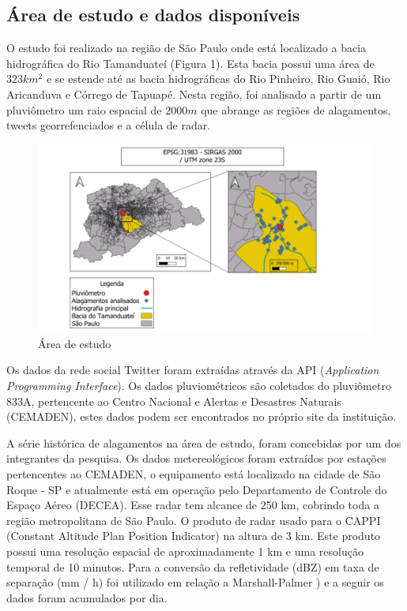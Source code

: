 \subsection{Área de estudo e dados disponíveis}
O estudo foi realizado na região de São Paulo onde está localizado a bacia hidrográfica do Rio Tamanduateí (Figura 1). Esta bacia possui uma área de \(323km^2\) e se estende até as bacia hidrográficas do Rio Pinheiro, Rio Guaió, Rio Aricanduva e Córrego de Tapuapé. Nesta região, foi analisado a partir de um pluviômetro um raio espacial de \(2000m\) que abrange as regiões de alagamentos, tweets georrefenciados e a célula de radar.
\begin{figure}[H]
    \centering
    \includegraphics[scale=0.5]{imagens/ic_att.png}
    \caption{Área de estudo }
    \label{fig:my_label}
\end{figure}

\par Os dados da rede social Twitter foram extraídas através da API (\textit{Application Programming Interface}). Os dados pluviométricos são coletados do pluviômetro 833A, pertencente ao Centro Nacional e Alertas e Desastres Naturais (CEMADEN), estes dados podem ser encontrados no próprio site da instituição.  
\par A série histórica de alagamentos na área de estudo, foram concebidas por um dos integrantes da pesquisa. Os dados metereológicos foram extraídos por estações pertencentes ao CEMADEN, o equipamento está localizado na cidade de São Roque - SP e atualmente está em operação pelo Departamento de Controle do Espaço Aéreo (DECEA). Esse radar tem alcance de 250 km, cobrindo toda a região metropolitana de São Paulo. O produto de radar usado para o CAPPI (Constant Altitude Plan Position Indicator) na altura de 3 km. Este produto possui uma resolução espacial de aproximadamente 1 km e uma resolução temporal de 10 minutos. Para a conversão da refletividade (dBZ) em taxa de separação (mm / h) foi utilizado em relação a Marshall-Palmer \cite{marshall1948mc}) e a seguir os dados foram acumulados por dia. 
